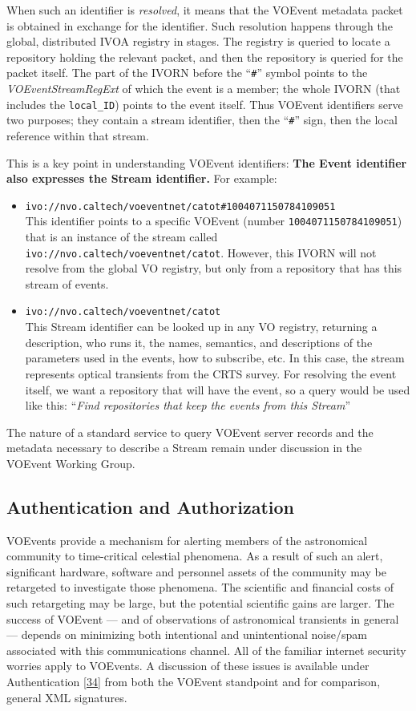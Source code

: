 \documentclass[11pt,a4paper]{ivoa}
\begin{document}
When such an identifier is \emph{resolved}, it means that the VOEvent metadata packet is obtained in exchange for the identifier. Such resolution happens through the global, distributed IVOA registry in stages. The registry is queried to locate a repository holding the relevant packet, and then the repository is queried for the packet itself. The part of the IVORN before the ``{\tt\#}'' symbol points to the \emph{VOEventStreamRegExt} of which the event is a member; the whole IVORN (that includes the {\tt local\_ID}) points to the event itself. Thus VOEvent identifiers serve two purposes; they contain a stream identifier, then the ``{\tt\#}'' sign, then the local reference within that stream. 

This is a key point in understanding VOEvent identifiers: {\bf The Event identifier also expresses the Stream identifier.} For example: 
\begin{itemize}
\item {\tt ivo://nvo.caltech/voeventnet/catot\#1004071150784109051}\\
This identifier points to a specific VOEvent (number {\tt 1004071150784109051}) that is an instance of the stream called {\tt ivo://nvo.caltech/voeventnet/catot}. However, this IVORN will not resolve from the global VO registry, but only from a repository that has this stream of events. 
\item {\tt ivo://nvo.caltech/voeventnet/catot}\\
This Stream identifier can be looked up in any VO registry, returning a description, who runs it, the names, semantics, and descriptions of the parameters used in the events, how to subscribe, etc. In this case, the stream represents optical transients from the CRTS survey. For resolving the event itself, we want a repository that will have the event, so a query would be used like this: ``\emph{Find repositories that keep the events from this Stream}'' 
\end{itemize}

The nature of a standard service to query VOEvent server records and the metadata necessary to describe a Stream remain under discussion in the VOEvent Working Group. 

\subsection{Authentication and Authorization}
\label{sec:2.3}
VOEvents provide a mechanism for alerting members of the astronomical community to time-critical celestial phenomena. As a result of such an alert, significant hardware, software and personnel assets of the community may be retargeted to investigate those phenomena. The scientific and financial costs of such retargeting may be large, but the potential scientific gains are larger. The success of VOEvent --- and of observations of astronomical transients in general --- depends on minimizing both intentional and unintentional noise/spam associated with this communications channel. All of the familiar internet security worries apply to VOEvents. A discussion of these issues is available under Authentication [\hyperref[bib34]{34}] from both the VOEvent standpoint and for comparison, general XML signatures. 
\end{document}
